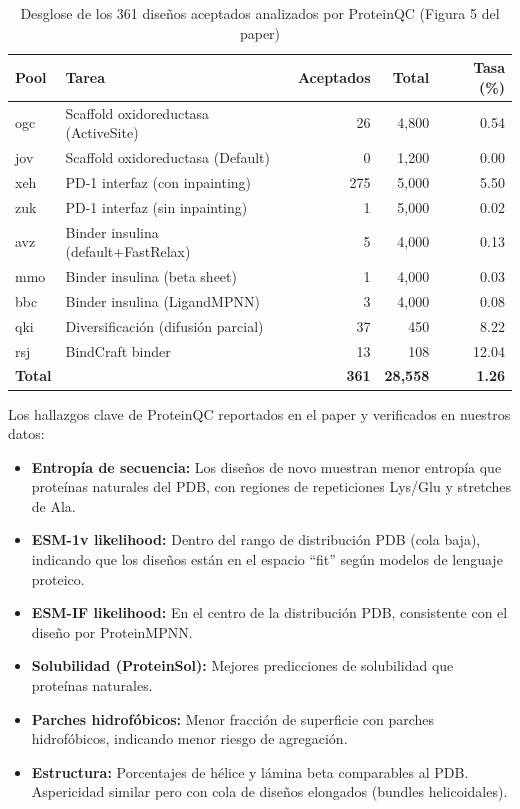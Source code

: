 \documentclass[10pt,a4paper,twocolumn]{article}
\begin{document}
\begin{table}[hbt!]
\centering
\caption{Desglose de los 361 diseños aceptados analizados por ProteinQC (Figura 5 del paper)}
\label{tab:proteinqc}
\begin{tabular}{llrrr}
\toprule
\textbf{Pool} & \textbf{Tarea} & \textbf{Aceptados} & \textbf{Total} & \textbf{Tasa (\%)} \\
\midrule
ogc & Scaffold oxidoreductasa (ActiveSite) & 26 & 4,800 & 0.54 \\
jov & Scaffold oxidoreductasa (Default) & 0 & 1,200 & 0.00 \\
xeh & PD-1 interfaz (con inpainting) & 275 & 5,000 & 5.50 \\
zuk & PD-1 interfaz (sin inpainting) & 1 & 5,000 & 0.02 \\
avz & Binder insulina (default+FastRelax) & 5 & 4,000 & 0.13 \\
mmo & Binder insulina (beta sheet) & 1 & 4,000 & 0.03 \\
bbc & Binder insulina (LigandMPNN) & 3 & 4,000 & 0.08 \\
qki & Diversificación (difusión parcial) & 37 & 450 & 8.22 \\
rsj & BindCraft binder & 13 & 108 & 12.04 \\
\midrule
\textbf{Total} & & \textbf{361} & \textbf{28,558} & \textbf{1.26} \\
\bottomrule
\end{tabular}
\end{table}

Los hallazgos clave de ProteinQC reportados en el paper y verificados en nuestros datos:

\begin{itemize}
    \item \textbf{Entropía de secuencia:} Los diseños de novo muestran menor entropía que proteínas naturales del PDB, con regiones de repeticiones Lys/Glu y stretches de Ala.

    \item \textbf{ESM-1v likelihood:} Dentro del rango de distribución PDB (cola baja), indicando que los diseños están en el espacio ``fit'' según modelos de lenguaje proteico.

    \item \textbf{ESM-IF likelihood:} En el centro de la distribución PDB, consistente con el diseño por ProteinMPNN.

    \item \textbf{Solubilidad (ProteinSol):} Mejores predicciones de solubilidad que proteínas naturales.

    \item \textbf{Parches hidrofóbicos:} Menor fracción de superficie con parches hidrofóbicos, indicando menor riesgo de agregación.

    \item \textbf{Estructura:} Porcentajes de hélice y lámina beta comparables al PDB. Aspericidad similar pero con cola de diseños elongados (bundles helicoidales).
\end{itemize}
\end{document}
